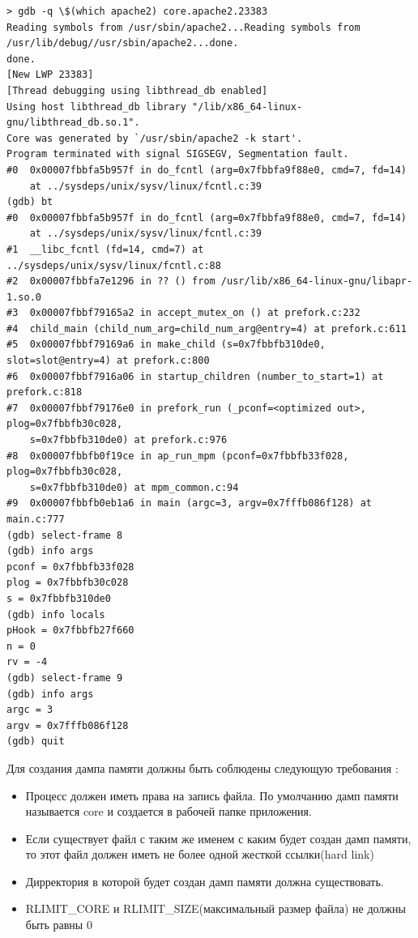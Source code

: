 \documentclass[20pt]{article}
\begin{document}
\begin{lstlisting}
> gdb -q \$(which apache2) core.apache2.23383
Reading symbols from /usr/sbin/apache2...Reading symbols from /usr/lib/debug//usr/sbin/apache2...done.
done.
[New LWP 23383]
[Thread debugging using libthread_db enabled]
Using host libthread_db library "/lib/x86_64-linux-gnu/libthread_db.so.1".
Core was generated by `/usr/sbin/apache2 -k start'.
Program terminated with signal SIGSEGV, Segmentation fault.
#0  0x00007fbbfa5b957f in do_fcntl (arg=0x7fbbfa9f88e0, cmd=7, fd=14)
    at ../sysdeps/unix/sysv/linux/fcntl.c:39
(gdb) bt
#0  0x00007fbbfa5b957f in do_fcntl (arg=0x7fbbfa9f88e0, cmd=7, fd=14)
    at ../sysdeps/unix/sysv/linux/fcntl.c:39
#1  __libc_fcntl (fd=14, cmd=7) at ../sysdeps/unix/sysv/linux/fcntl.c:88
#2  0x00007fbbfa7e1296 in ?? () from /usr/lib/x86_64-linux-gnu/libapr-1.so.0
#3  0x00007fbbf79165a2 in accept_mutex_on () at prefork.c:232
#4  child_main (child_num_arg=child_num_arg@entry=4) at prefork.c:611
#5  0x00007fbbf79169a6 in make_child (s=0x7fbbfb310de0, slot=slot@entry=4) at prefork.c:800
#6  0x00007fbbf7916a06 in startup_children (number_to_start=1) at prefork.c:818
#7  0x00007fbbf79176e0 in prefork_run (_pconf=<optimized out>, plog=0x7fbbfb30c028,
    s=0x7fbbfb310de0) at prefork.c:976
#8  0x00007fbbfb0f19ce in ap_run_mpm (pconf=0x7fbbfb33f028, plog=0x7fbbfb30c028,
    s=0x7fbbfb310de0) at mpm_common.c:94
#9  0x00007fbbfb0eb1a6 in main (argc=3, argv=0x7fffb086f128) at main.c:777
(gdb) select-frame 8
(gdb) info args
pconf = 0x7fbbfb33f028
plog = 0x7fbbfb30c028
s = 0x7fbbfb310de0
(gdb) info locals
pHook = 0x7fbbfb27f660
n = 0
rv = -4
(gdb) select-frame 9
(gdb) info args
argc = 3
argv = 0x7fffb086f128
(gdb) quit
\end{lstlisting}

Для создания дампа памяти должны быть соблюдены следующую требования \cite{man/coredump}:
\begin{itemize}
  \item Процесс должен иметь права на запись файла. По умолчанию дамп памяти
  называется core и создается в рабочей папке приложения.
  \item Если существует файл с таким же именем с каким будет создан дамп памяти,
  то этот файл должен иметь не более одной жесткой ссылки(hard link)
  \item Дирректория в которой будет создан дамп памяти должна существовать.
  \item RLIMIT\_CORE и RLIMIT\_SIZE(максимальный размер файла) не должны быть равны 0
\end{itemize}
\end{document}
